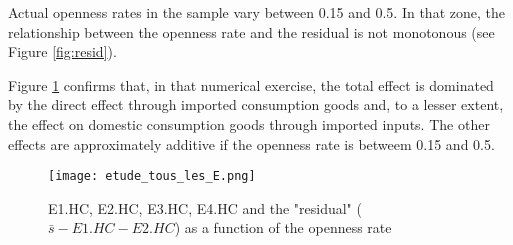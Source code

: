 \documentclass[11pt,a4paper]{article}
\begin{document}
Actual openness rates in the sample vary between 0.15 and 0.5. In that zone, the relationship between the openness rate and the residual is not monotonous (see Figure \ref{fig:resid}).

Figure \ref{fig:tous_les_E} confirms that, in that numerical exercise, the total effect is dominated by the direct effect through imported consumption goods and, to a lesser extent, the effect on domestic consumption goods through imported inputs. 
The other effects are approximately additive if the openness rate is betweem 0.15 and 0.5.

\begin{figure}[!h]
	\begin{center}
		\texttt{[image: etude\_tous\_les\_E.png]}
		\caption{E1.HC, E2.HC, E3.HC, E4.HC and the "residual"  ($\bar{s}-E1.HC-E2.HC$) as a function of the openness rate}
		\label{fig:tous_les_E}
	\end{center}
\end{figure}
\end{document}

